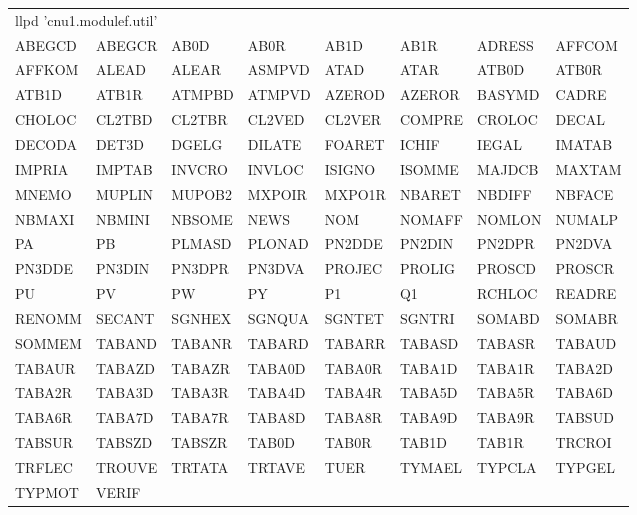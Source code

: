 {\tiny\ttfamily
\noindent\begin{tabular}{@{}llllllll@{}}
\multicolumn{8}{l}{llpd 'cnu1.modulef.util'}\\
ABEGCD & ABEGCR & AB0D & AB0R & AB1D & AB1R & ADRESS & AFFCOM\\
AFFKOM & ALEAD & ALEAR & ASMPVD & ATAD & ATAR & ATB0D & ATB0R\\
ATB1D & ATB1R & ATMPBD & ATMPVD & AZEROD & AZEROR & BASYMD & CADRE\\
CHOLOC & CL2TBD & CL2TBR & CL2VED & CL2VER & COMPRE & CROLOC & DECAL\\
DECODA & DET3D & DGELG & DILATE & FOARET & ICHIF & IEGAL & IMATAB\\
IMPRIA & IMPTAB & INVCRO & INVLOC & ISIGNO & ISOMME & MAJDCB & MAXTAM\\
MNEMO & MUPLIN & MUPOB2 & MXPOIR & MXPO1R & NBARET & NBDIFF & NBFACE\\
NBMAXI & NBMINI & NBSOME & NEWS & NOM & NOMAFF & NOMLON & NUMALP\\
PA & PB & PLMASD & PLONAD & PN2DDE & PN2DIN & PN2DPR & PN2DVA\\
PN3DDE & PN3DIN & PN3DPR & PN3DVA & PROJEC & PROLIG & PROSCD & PROSCR\\
PU & PV & PW & PY & P1 & Q1 & RCHLOC & READRE\\
RENOMM & SECANT & SGNHEX & SGNQUA & SGNTET & SGNTRI & SOMABD & SOMABR\\
SOMMEM & TABAND & TABANR & TABARD & TABARR & TABASD & TABASR & TABAUD\\
TABAUR & TABAZD & TABAZR & TABA0D & TABA0R & TABA1D & TABA1R & TABA2D\\
TABA2R & TABA3D & TABA3R & TABA4D & TABA4R & TABA5D & TABA5R & TABA6D\\
TABA6R & TABA7D & TABA7R & TABA8D & TABA8R & TABA9D & TABA9R & TABSUD\\
TABSUR & TABSZD & TABSZR & TAB0D & TAB0R & TAB1D & TAB1R & TRCROI\\
TRFLEC & TROUVE & TRTATA & TRTAVE & TUER & TYMAEL & TYPCLA & TYPGEL\\
TYPMOT & VERIF
\end{tabular}}


